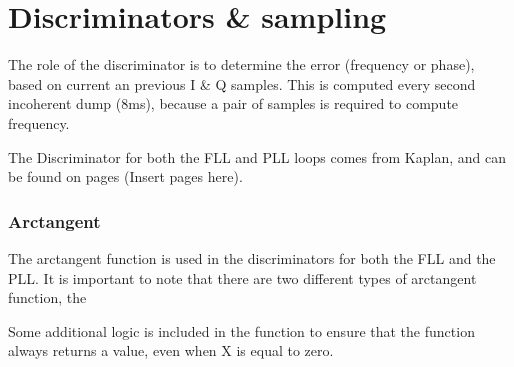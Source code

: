 \chapter{Discriminators \& sampling}
\label{ch:Discriminators}

The role of the discriminator is to determine the error (frequency or phase), based on current an previous I \& Q samples. This is computed every second incoherent dump (8ms), because a pair of samples is required to compute frequency. 

The Discriminator for both the FLL and PLL loops comes from Kaplan, and can be found on pages (Insert pages here).





\begin{comment}
"It is important to note that the timing of each of the correlator channels will be locked to its own incoming signal and not to each other or to the microprocessor interrupts, so new data is generated asynchronously. The sampling instant of measurement data of all channels however is common to give a consistent navigation solution."

"Carrier DCO Programming
The following registers: CHx_CARRIER_DCO_INCR_HIGH (or X_DCO _INCR_HIGH) and CHx_CARRIER_DCO_INCR_LOW
are programmed in sequence with the relevant data according to the frequency bin being searched. It is always necessary to write to both the _HIGH and _LOW registers. Carrier DCO programming will become effective as soon as the channel is released (made active). If the channel is already active, writes to CHx_CARRIER_DCO_INCR_LOW are effective immediately. (A short delay of up to 175ns will occur, to allow synchronisation of the processor write operation to the chip operation.)"
\cite{GP2021}
\end{comment}

\subsection{Arctangent}
The arctangent function is used in the discriminators for both the FLL and the PLL. It is important to note that there are two different types of arctangent function, the 


Some additional logic is included in the function to ensure that the function always returns a value, even when X is equal to zero.

